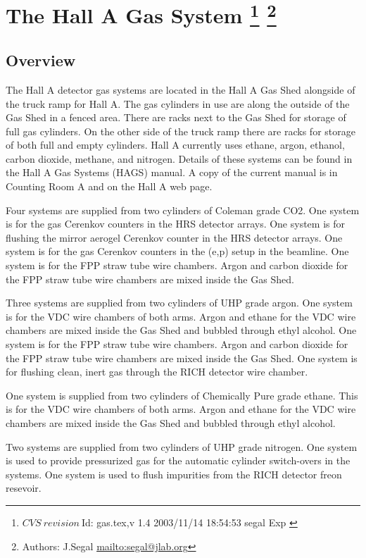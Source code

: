 \section[The Hall A Gas System]{The Hall A Gas System
\footnote{
  $CVS~revision~ $Id: gas.tex,v 1.4 2003/11/14 18:54:53 segal Exp $ $
}
\footnote{Authors: J.Segal \url{mailto:segal@jlab.org}}
}

\subsection{Overview}
The Hall A detector gas systems are located in the Hall A Gas Shed
alongside of the truck ramp for Hall A.  The gas cylinders in use
are along the outside of the Gas Shed in a fenced area.
There are racks next to
the Gas Shed for storage of full gas cylinders.  On the other side of the
truck ramp there are racks for storage of both full and empty cylinders.
Hall A currently uses ethane, argon, ethanol, carbon dioxide, methane, 
and nitrogen.
Details of these systems can be found in the Hall A Gas Systems (HAGS) manual.
A copy of the current manual is in Counting Room A and on the Hall A web page.

Four systems are supplied from two cylinders of Coleman grade CO2.
One system is for the gas Cerenkov counters in the HRS detector arrays.
One system is for
flushing the mirror aerogel Cerenkov counter in the HRS detector arrays.
One system is for
the gas Cerenkov counters in the (e,p) setup in the beamline.
One system is for the FPP straw tube wire chambers.
Argon and carbon dioxide for the FPP straw tube wire chambers
are mixed inside the Gas Shed.

Three systems are supplied from two cylinders of UHP grade argon.
One system is for the VDC wire chambers
of both arms.  Argon and ethane for the VDC wire chambers are
mixed inside the Gas Shed and bubbled
through ethyl alcohol.
One system is for the FPP straw tube wire chambers.
Argon and carbon dioxide for the FPP straw tube wire chambers
are mixed inside the Gas Shed.
One system is for flushing clean, inert gas through the RICH detector
wire chamber.

One system is supplied from two cylinders 
of Chemically Pure grade ethane.  This is for the VDC wire chambers
of both arms.  Argon and ethane for the VDC wire chambers
are mixed inside the Gas Shed and bubbled
through ethyl alcohol.

Two systems are supplied from two cylinders of UHP grade nitrogen.
One system is used to provide pressurized
gas for the automatic cylinder switch-overs in the systems.
One system is used to flush impurities from the RICH detector
freon resevoir.

